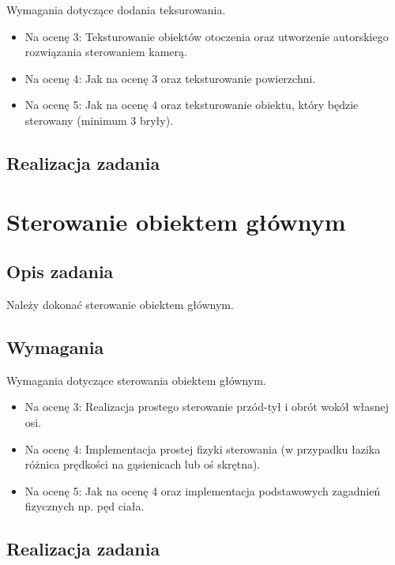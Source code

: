 \documentclass[a4paper, 12pt]{article}
\begin{document}
Wymagania dotyczące dodania teksurowania.
\begin{itemize}
\item Na ocenę 3: Teksturowanie obiektów otoczenia oraz utworzenie autorskiego rozwiązania sterowaniem kamerą.
\item Na ocenę 4: Jak na ocenę 3 oraz teksturowanie powierzchni.
\item Na ocenę 5: Jak na ocenę 4 oraz teksturowanie obiektu, który będzie sterowany (minimum 3 bryły).
\end{itemize}
\subsection{Realizacja zadania}

\section{Sterowanie obiektem głównym}
\subsection{Opis zadania}
Należy dokonać sterowanie obiektem głównym.
\subsection{Wymagania}
Wymagania dotyczące sterowania obiektem głównym.
\begin{itemize}
\item Na ocenę 3: Realizacja prostego sterowanie przód-tył i obrót wokół własnej osi.
\item Na ocenę 4: Implementacja prostej fizyki sterowania (w przypadku łazika różnica prędkości na gąsienicach lub oś skrętna).
\item Na ocenę 5: Jak na ocenę 4 oraz implementacja podstawowych zagadnień fizycznych np. pęd ciała.
\end{itemize}
\subsection{Realizacja zadania}
\end{document}
